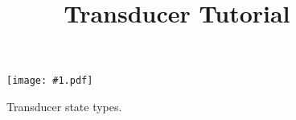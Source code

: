 \documentclass{article}
\newcommand{\figlabel}[1]{\label{Figures.#1}}
\newcommand{\standardfigure}[2]{
\begin{figure}
\texttt{[image: \#1.pdf]}
\caption{ \figlabel{#1} #2}
\end{figure}}
\begin{document}
\title{Transducer Tutorial}
\date{}
\maketitle

\standardfigure{legend}{Transducer state types.}
\end{document}
